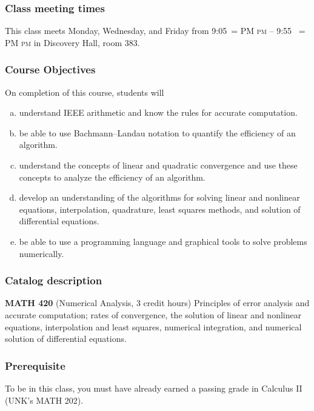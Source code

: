 \documentclass[12pt,fullpage]{article}
\makeatletter
\newcounter{ex}\setcounter{ex}{0}
\newenvironment{alphalist}{
  \begin{enumerate}[(a)]
    \addtolength{\itemsep}{-0.5\itemsep}}
  {\end{enumerate}}
\DeclareRobustCommand{\maybefakesc}[1]{%
  \ifnum\pdfstrcmp{\f@series}{\bfdefault}=\z@
    {\fontsize{\dimexpr0.8\dimexpr\f@size pt\relax}{0}\selectfont\uppercase{#1}}%
  \else
    \textsc{#1}%
  \fi
}
\newcommand\PM{\,\maybefakesc{pm}\xspace}
\newcommand{\room}{Discovery Hall, room  383}
\newcommand{\meetingtime}{This class meets Monday, Wednesday, and Friday  from 
	9:05\PM{}  --  9:55 \PM}
\makeatother
\begin{document}
    \subsubsection*{Class meeting times}

\meetingtime{} in \room.



\subsubsection*{Course Objectives}

On completion of this course, students will
\begin{alphalist}
    \item understand IEEE arithmetic and know the rules for accurate computation.
    \item be able to use Bachmann–Landau notation to quantify the efficiency of an algorithm.
    
    \item understand the concepts of linear and quadratic convergence and use these concepts to analyze 
        the efficiency of an algorithm.
    \item develop an understanding of the algorithms for solving linear and nonlinear equations, interpolation, 
       quadrature, least squares methods, and solution of differential equations.
    \item be able to use a programming language and graphical tools to solve problems 
    numerically.
\end{alphalist}

\subsubsection*{Catalog description}

    \textbf{MATH 420} (Numerical Analysis, 3 credit hours) Principles of
    error analysis and accurate computation; rates of convergence, the solution 
    of linear and nonlinear equations, interpolation and least squares, 
    numerical integration, and numerical solution of differential equations.


\subsubsection*{Prerequisite}

To be in this class, you must have already earned a passing grade in Calculus II (UNK's MATH 202).
\end{document}
